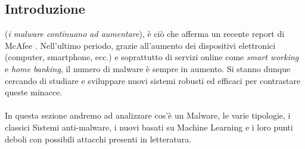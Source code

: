\subsection{Introduzione}
 (\textit{i malware continuano ad aumentare}), è ciò che afferma un recente report di McAfee \cite{malware}. Nell'ultimo periodo, grazie all'aumento dei dispositivi elettronici (computer, smartphone, ecc.) e soprattutto di servizi online come \textit{smart working} e \textit{home banking}, il numero di malware è sempre in aumento. Si stanno dunque cercando di studiare e sviluppare nuovi sistemi robusti ed efficaci per contrastare queste minacce.\\
\\
In questa sezione andremo ad analizzare cos'è un Malware, le varie tipologie, i classici Sistemi anti-malware, i nuovi basati su Machine Learning e i loro punti deboli con possibili attacchi presenti in letteratura.
